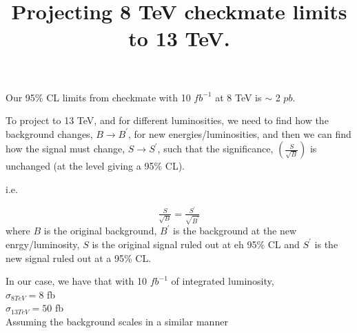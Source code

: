 \message{ !name(extending_limits.tex)}\documentclass[12pt,a4paper]{article}
\begin{document}


\title{Projecting 8 TeV checkmate limits to 13 TeV.}
\maketitle
Our 95\% CL limits from checkmate with 10 $fb^{-1}$ at 8 TeV is $\sim$ 2 $pb$.

To project to 13 TeV, and for different luminosities, we need to find how the background changes, $B \to B^{\prime}$, for new energies/luminosities, and then we can find how the signal must change, $S \to S^{\prime}$, such that the significance, $\left(\tfrac{S}{\sqrt{B}} \right)$ is unchanged (at the level giving a 95\% CL).

i.e. 

\begin{equation}
  \tfrac{S}{\sqrt{B}} = \tfrac{S^{\prime}}{\sqrt{B^{\prime}}}
\end{equation}
where $B$ is the original background, $B^{\prime}$ is the background at the new enrgy/luminosity, $S$ is the original signal ruled out at eh 95\% CL and $S^{\prime}$ is the new signal ruled out at a 95\% CL.

In our case, we have that with 10 $fb^{-1}$ of integrated luminosity,\\
$\sigma_{8 TeV} = 8 $ fb\\
$\sigma_{13 TeV} = 50$ fb\\

Assuming the background scales in a similar manner

\end{document}
